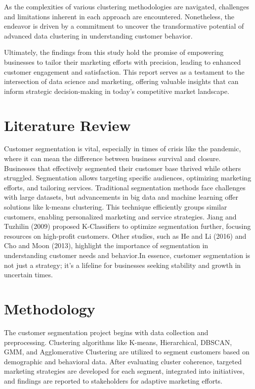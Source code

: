 \documentclass{josis}
\begin{document}
As the complexities of various clustering methodologies are navigated, challenges and limitations inherent in each approach are encountered. Nonetheless, the endeavor is driven by a commitment to uncover the transformative potential of advanced data clustering in understanding customer behavior.

Ultimately, the findings from this study hold the promise of empowering businesses to tailor their marketing efforts with precision, leading to enhanced customer engagement and satisfaction. This report serves as a testament to the intersection of data science and marketing, offering valuable insights that can inform strategic decision-making in today's competitive market landscape.
\section{Literature Review}
Customer segmentation is vital, especially in times of crisis like the pandemic, where it can mean the difference between business survival and closure. Businesses that effectively segmented their customer base thrived while others struggled. Segmentation allows targeting specific audiences, optimizing marketing efforts, and tailoring services. Traditional segmentation methods face challenges with large datasets, but advancements in big data and machine learning offer solutions like k-means clustering. This technique efficiently groups similar customers, enabling personalized marketing and service strategies. Jiang and Tuzhilin (2009) proposed K-Classifiers to optimize segmentation further, focusing resources on high-profit customers. Other studies, such as He and Li (2016) and Cho and Moon (2013), highlight the importance of segmentation in understanding customer needs and behavior.In essence, customer segmentation is not just a strategy; it's a lifeline for businesses seeking stability and growth in uncertain times.


\section{Methodology}

The customer segmentation project begins with data collection and preprocessing. Clustering algorithms like K-means, Hierarchical, DBSCAN, GMM, and Agglomerative Clustering are utilized to segment customers based on demographic and behavioral data. After evaluating cluster coherence, targeted marketing strategies are developed for each segment, integrated into initiatives, and findings are reported to stakeholders for adaptive marketing efforts.
\end{document}
